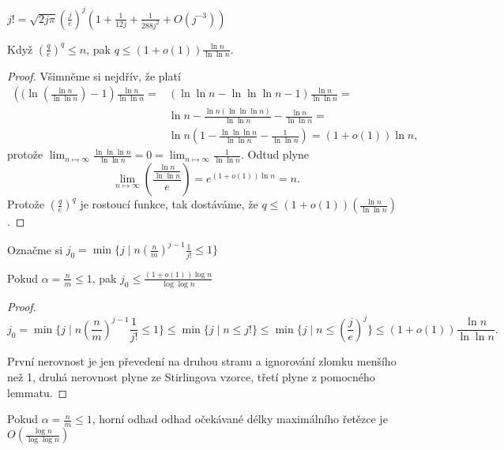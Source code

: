 \documentclass[a4paper,12pt]{article}
\begin{document}
\begin{lemma}
    $j!=\sqrt{2j\pi}\left(\frac je\right)^j\left(1+\frac 1{12j}+\frac 1{288j^2}+O(j^{-3})\right)$
\end{lemma}

\begin{lemma}
    Když $(\frac qe)^q\le n$, pak $q\le(1+o(1))\frac{\ln n}{\ln\ln n}$.
\end{lemma}

\begin{proof}Všimněme si nejdřív, že platí
\begin{align*}\left((\ln(\frac{\ln n}{\ln\ln n})-1\right)\frac{\ln n}{\ln\ln n}=&(\ln\ln n-\ln\ln\ln n-1)\frac{\ln n}{\ln\ln n}=\\&
\ln n-\frac{\ln n(\ln\ln\ln n)}{\ln\ln n}-\frac{\ln n}{\ln\ln n}=\\&\ln n(1-\frac{\ln\ln\ln n}{\ln\ln n}-
\frac 1{\ln\ln n})=(1+o(1))\ln n,\end{align*}
protože $\lim_{n\mapsto\infty}\frac{\ln\ln\ln n}{\ln\ln n}=0=\lim_{n\mapsto\infty}\frac 1{\ln\ln n}$. 
Odtud plyne $$\lim_{n\mapsto\infty}\left(\frac{\frac{\ln n}{\ln\ln n}}e\right)=e^{(1+o(1))\ln n}=n.$$ Protože $(\frac qe)^q$ je rostoucí funkce, tak dostáváme, že $q\le(1+o(1))(\frac{\ln n}{\ln\ln n})$.
\end{proof}

Označme si $j_0 = \min\{j\mid n(\frac nm)^{j-1}\frac 1{j!}\le 1\}$

\begin{lemma}[Omezení $j_0$]
    Pokud  $\alpha =\frac nm\le 1$, pak $j_0\le\frac {(1+o(1))\log n}{\log\log n}$
\end{lemma}

\begin{proof}
    $$j_0=\min\{j\mid n(\frac nm)^{j-1}\frac 1{j!}\le 1\}\le\min\{j\mid n\le j!\}\le\min\{j\mid n\le
    (\frac je)^j\}\le(1+o(1))\frac{\ln n}{\ln\ln n}.$$
    
    První nerovnost je jen převedení na druhou stranu a ignorování zlomku menšího než 1, druhá nerovnost plyne ze Stirlingova vzorce, třetí plyne z pomocného lemmatu.
\end{proof}

\begin{veta}
    Pokud  $\alpha =\frac nm\le 1$, horní odhad odhad očekávané délky 
    maximálního ře\-těz\-ce je $O(\frac {\log n}{\log\log n})$
\end{veta}
 
\end{document}

